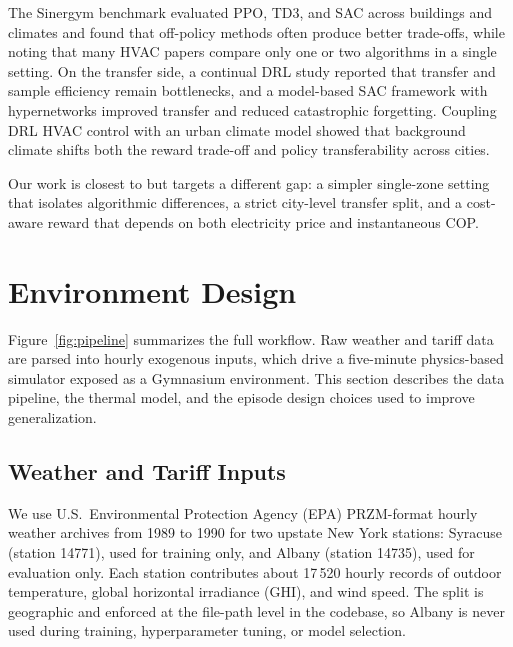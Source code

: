 \documentclass[conference]{IEEEtran}
\newcommand{\acGHI}{global horizontal irradiance (GHI)}
\begin{document}
The Sinergym benchmark \cite{manjavacas2024drl_hvac} evaluated PPO, TD3,
and SAC across buildings and climates and found that off-policy methods
often produce better trade-offs, while noting that many HVAC papers
compare only one or two algorithms in a single setting. On the transfer
side, a continual DRL study \cite{bekal2025continual_hvac} reported that
transfer and sample efficiency remain bottlenecks, and a model-based SAC
framework with hypernetworks improved transfer and reduced catastrophic
forgetting. Coupling DRL HVAC control with an urban climate model
\cite{yu2025rl_urban_hvac} showed that background climate shifts both
the reward trade-off and policy transferability across cities.

Our work is closest to \cite{manjavacas2024drl_hvac} but targets a
different gap: a simpler single-zone setting that isolates algorithmic
differences, a strict city-level transfer split, and a cost-aware reward
that depends on both electricity price and instantaneous COP.

\section{Environment Design}
\label{sec:environment}

Figure~\ref{fig:pipeline} summarizes the full workflow. Raw weather and
tariff data are parsed into hourly exogenous inputs, which drive a
five-minute physics-based simulator exposed as a Gymnasium environment.
This section describes the data pipeline, the thermal model, and the
episode design choices used to improve generalization.

\subsection{Weather and Tariff Inputs}
\label{subsec:data}

We use U.S.\ Environmental Protection Agency (EPA) PRZM-format hourly
weather archives from 1989 to 1990 for two upstate New York stations:
Syracuse (station 14771), used for training only, and Albany (station
14735), used for evaluation only. Each station contributes about
17\,520 hourly records of outdoor temperature, \acGHI{}, and wind speed.
The split is geographic and enforced at the file-path level in the
codebase, so Albany is never used during training, hyperparameter tuning,
or model selection.
\end{document}
